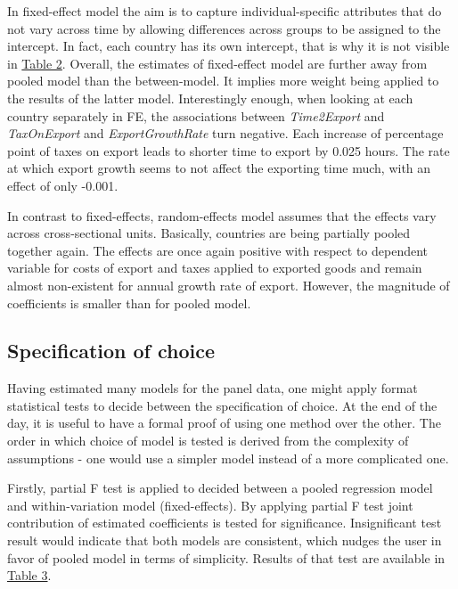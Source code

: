 \documentclass{article}
\begin{document}
In fixed-effect model the aim is to capture individual-specific attributes that do not vary across time by allowing  differences across groups to be assigned to the intercept. In fact, each country has its own intercept, that is why it is not visible in \hyperref[tab:4models]{Table 2}. Overall, the estimates of fixed-effect model are further away from pooled model than the between-model. It implies more weight being applied to the results of the latter model. Interestingly enough, when looking at each country separately in FE, the associations between \textit{Time2Export} and \textit{TaxOnExport} and \textit{ExportGrowthRate} turn negative. Each increase of percentage point of taxes on export leads to shorter time to export by 0.025 hours. The rate at which export growth seems to not affect the exporting time much, with an effect of only -0.001.

In contrast to fixed-effects, random-effects model assumes that the effects vary across cross-sectional units. Basically, countries are being partially pooled together again. The effects are once again positive with respect to dependent variable for costs of export and taxes applied to exported goods and remain almost non-existent for annual growth rate of export. However, the magnitude of coefficients is smaller than for pooled model.

\subsection{Specification of choice}

Having estimated many models for the panel data, one might apply format statistical tests to decide between the specification of choice. At the end of the day, it is useful to have a formal proof of using one method over the other. The order in which choice of model is tested is derived from the complexity of assumptions - one would use a simpler model instead of a more complicated one.

Firstly, partial F test is applied to decided between a pooled regression model and within-variation model (fixed-effects). By applying partial F test joint contribution of estimated coefficients is tested for significance. Insignificant test result would indicate that both models are consistent, which nudges the user in favor of pooled model in terms of simplicity. Results of that test are available in \hyperref[tab:ftest]{Table 3}. 
\end{document}
